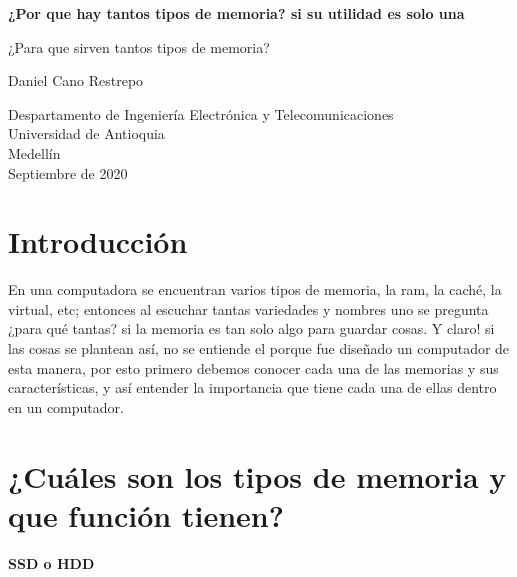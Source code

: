 \documentclass{article}
\begin{document}
\begin{titlepage}
    \begin{center}
        
        \huge
        \textbf{¿Por que hay tantos tipos de memoria? si su utilidad es solo una}
        \large 
        
        \vspace{1cm}
        ¿Para que sirven tantos tipos de memoria?
        \vspace{4cm}
        
        Daniel Cano Restrepo
        
        \vspace{9cm}
        
        \small
        Despartamento de Ingeniería Electrónica y Telecomunicaciones\\
        Universidad de Antioquia\\
        Medellín\\
        Septiembre de 2020
        
    \end{center}
\end{titlepage}

\tableofcontents



\newpage
\section{Introducción}

\vspace{1cm}
En una computadora se encuentran varios tipos de memoria, la ram, la caché, la virtual, etc; entonces al escuchar tantas variedades y nombres uno se pregunta ¿para qué tantas? si la memoria es tan solo algo para guardar cosas. Y claro! si las cosas se plantean así, no se entiende el porque fue diseñado un computador de esta manera, por esto primero debemos conocer cada una de las memorias y sus características, y así entender la importancia que tiene cada una de ellas dentro en un computador.

\vspace{3cm}

\section{¿Cuáles son los tipos de memoria y que función tienen?}
\vspace{1cm}
\begin{center}
    \textbf{SSD o HDD}
\end{center}
\end{document}
